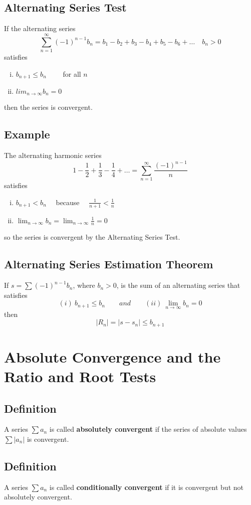 \subsection*{Alternating Series Test}
If the alternating series
$$ \sum_{n=1}^\infty(-1)^{n-1}b_n=b_1-b_2+b_3-b_4+b_5-b_6+\dots \quad b_n>0 $$
satisfies
\begin{enumerate}[(i)]
    \item $b_{n+1} \leq b_n \qquad$ for all $n$
    \item $lim_{n \to \infty} b_n = 0$
\end{enumerate}
then the series is convergent.

\subsection*{Example}
The alternating harmonic series
$$1-\frac{1}{2}+\frac{1}{3}-\frac{1}{4}+\dots = \sum_{n=1}^\infty\frac{(-1)^{n-1}}{n}$$
satisfies
\begin{enumerate}[(i)]
    \item $b_{n+1}<b_n \quad$ because $\quad \frac{1}{n+1}<\frac{1}{n}$
    \item $\lim_{n\to\infty}b_n=\lim_{n\to\infty}\frac{1}{n}=0$
\end{enumerate}
so the series is convergent by the Alternating Series Test.

\subsection*{Alternating Series Estimation Theorem}
If $s= \sum (-1)^{n-1}b_n$, where $b_n>0$, is the sum of an alternating series that satisfies
$$ (i)\: b_{n+1} \leq b_n \qquad and \qquad (ii)\: \lim_{n \to \infty} b_n = 0 $$
then
$$ |R_n|=|s-s_n| \leq b_{n+1}$$

\section{Absolute Convergence and the Ratio and Root Tests}

\subsection*{Definition}
A series $\sum a_n$ is called \textbf{absolutely convergent} if the series of absolute
values $\sum |a_n|$ is convergent.

\subsection*{Definition}
A series $\sum a_n$ is called \textbf{conditionally convergent} if it is convergent but
not absolutely convergent.

